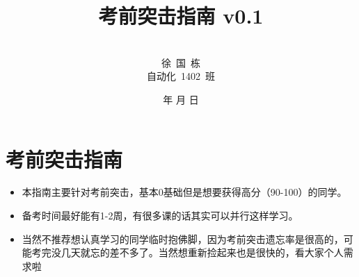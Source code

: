 \documentclass[a4paper]{article}
\begin{document}
\renewcommand{\contentsname}{目\ 录}
\renewcommand{\appendixname}{附录}
\renewcommand{\appendixpagename}{附录}
\renewcommand{\refname}{参考文献} 
\renewcommand{\figurename}{图}
\renewcommand{\tablename}{表}
\renewcommand{\today}{\number\year 年 \number\month 月 \number\day 日}

\title{{\Huge 考前突击指南 v0.1{\large\linebreak\\}}}
\author{\\徐\ 国\ 栋\\
自动化\ 1402\ 班}
\date{\today}
\maketitle
\newpage

\begin{center}
\tableofcontents\label{c}
\end{center}
\newpage



\section{考前突击指南} \label{overview}%
\begin{itemize}
	\item 本指南主要针对考前突击，基本0基础但是想要获得高分（90-100）的同学。
	\item 备考时间最好能有1-2周，有很多课的话其实可以并行这样学习。
	\item 当然不推荐想认真学习的同学临时抱佛脚，因为考前突击遗忘率是很高的，可能考完没几天就忘的差不多了。当然想重新捡起来也是很快的，看大家个人需求啦\ \faSmileO
\end{itemize}
\end{document}
